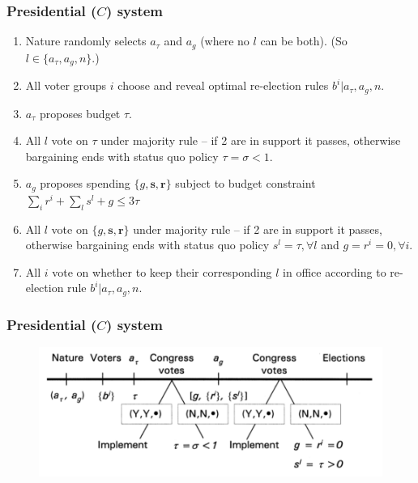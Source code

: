 \documentclass[11pt,aspectratio=169]{beamer}
\begin{document}
\begin{frame}
\frametitle{Presidential ($C$) system}

\begin{enumerate}
\item Nature randomly selects $a_{\tau}$ and $a_g$ (where no $l$ can be both). (So $l\in\{a_\tau, a_g, n\}.$)

\item All voter groups $i$ choose and reveal optimal re-election rules $b^i|a_{\tau},a_g,n$. 

\item $a_{\tau}$ proposes budget $\tau$. 

\item All $l$ vote on $\tau$ under majority rule -- if 2 are in support it passes, otherwise bargaining ends with status quo policy $\tau=\sigma <1$. 

\item $a_g$ proposes spending $\{g,\textbf{s},\textbf{r}\}$ subject to budget constraint $\sum_i r^i+\sum_l s^l+g \leq 3\tau$
\item All $l$ vote on $\{g,\textbf{s},\textbf{r}\}$ under majority rule -- if 2 are in support it passes, otherwise bargaining ends with status quo policy $s^l=\tau, \forall l$ and $g=r^i=0, \forall i$.

\item All $i$ vote on whether to keep their corresponding $l$ in office according to re-election rule $b^i|a_{\tau},a_g,n$.
\end{enumerate}

\end{frame}


\begin{frame}
\frametitle{Presidential ($C$) system}

\begin{figure}[h]
\begin{center}
\includegraphics[scale=0.5]{PRT_pres.png}
\end{center}
\end{figure}

\end{frame}
\end{document}
